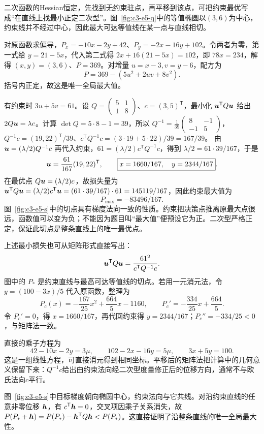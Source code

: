 \begin{solution}
二次函数的Hessian恒定，先找到无约束驻点，再平移到该点，可把约束最优写成“在直线上找最小正定二次型”。图~\ref{fig:c3-e5-q}中的等值椭圆以$(3,6)$为中心，约束线并不经过中心，因此最大可达等值线在某一点与直线相切。


对原函数求偏导，$P_x=-10x-2y+42$、$P_y=-2x-16y+102$。令两者为零，第一式给 $y=21-5x$，代入第二式得 $2x+16(21-5x)=102$，即 $78x=234$，解得 $(x,y)=(3,6)$、$P=369$。对增量 $u=x-3,v=y-6$，配方为
\[P=369-(5u^2+2uv+8v^2).
\]
括号内正定，故这是唯一全局最大值。

有约束时 $3u+5v=61$。设 $Q=\begin{pmatrix}5&1\\1&8\end{pmatrix}$、$c=(3,5)^{\mathsf T}$，最小化 $\bm{u}^{\mathsf T}Q\bm{u}$ 给出 $2Q\bm{u}=\lambda c$。计算 $\det Q=5\cdot8-1=39$，所以 $Q^{-1}=\tfrac1{39}\begin{pmatrix}8&-1\\-1&5\end{pmatrix}$，$Q^{-1}c=(19,22)^{\mathsf T}/39$、$c^{\mathsf T}Q^{-1}c=(3\cdot19+5\cdot22)/39=167/39$。
由 $\bm{u}=(\lambda/2)Q^{-1}c$ 再代入约束，$61=(\lambda/2)c^{\mathsf T}Q^{-1}c$，得到 $\lambda/2=61\cdot39/167$，于是
\[\bm{u}=\frac{61}{167}(19,22)^{\mathsf T},\qquad
\boxed{x=1660/167,\quad y=2344/167}.
\]
在最优点 $Q\bm{u}=(\lambda/2)c$，故损失量为 $\bm{u}^{\mathsf T}Q\bm{u}=(\lambda/2)c^{\mathsf T}\bm{u}=(61\cdot39/167)\cdot61=145119/167$，因此约束最大值为
\[\boxed{P_{\max}=-83496/167}.\]
图~\ref{fig:c3-e5-s}中的切点具有梯度法向一致的性质。约束把决策点推离原最大点很远，函数值可以变为负；不能因为题目叫“最大值”便预设它为正。二次型严格正定，保证此切点是整条直线上的唯一最优点。


上述最小损失也可从矩阵形式直接写出：
\[\bm{u}^{\mathsf T}Q\bm{u}=\frac{61^2}{c^{\mathsf T}Q^{-1}c}.\]
图中的 $P_*$ 是约束直线与最高可达等值线的切点。若用一元消元法，令 $y=(100-3x)/5$ 代入原函数，整理为
\[
P_c(x)=-\frac{167}{25}x^2+\frac{664}{5}x-1160,
\qquad P_c'=-\frac{334}{25}x+\frac{664}{5}.
\]
令 $P_c'=0$，得 $x=1660/167$，再代回约束得 $y=2344/167$；$P_c''=-334/25<0$，与矩阵法一致。

直接的乘子方程为
\[42-10x-2y=3\mu,\qquad102-2x-16y=5\mu,\qquad3x+5y=100.\]
这是一组线性方程，可直接消元得到相同坐标。平移后的矩阵法把计算中的几何意义保留下来：$Q^{-1}c$给出由约束法向经二次型度量修正后的位移方向，通常不与欧氏法向$c$平行。

图~\ref{fig:c3-e5-s}中目标梯度朝向椭圆中心，约束法向与它共线。对沿约束直线的任意非零位移 $\bm{h}$，有 $c^{\mathsf T}\bm{h}=0$，交叉项因乘子关系消失，故 $P(P_*+\bm{h})=P(P_*)-\bm{h}^{\mathsf T}Q\bm{h}<P(P_*)$。这直接证明了沿整条直线的唯一全局最大性。


\end{solution}
